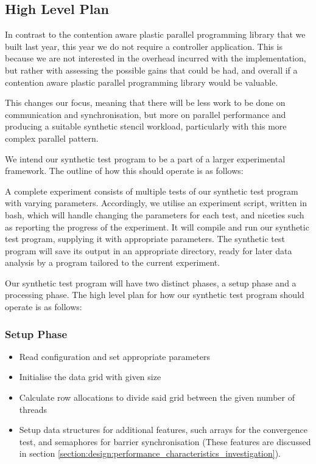 \subsection{High Level Plan}
\label{section:implementation:high_level_plan}

In contrast to the contention aware plastic parallel programming library that we built last year, this year we do not require a controller application. This is because we are not interested in the overhead incurred with the implementation, but rather with assessing the possible gains that could be had, and overall if a contention aware plastic parallel programming library would be valuable.

This changes our focus, meaning that there will be less work to be done on communication and synchronisation, but more on parallel performance and producing a suitable synthetic stencil workload, particularly with this more complex parallel pattern.

We intend our synthetic test program to be a part of a larger experimental framework. The outline of how this should operate is as follows: 

A complete experiment consists of multiple tests of our synthetic test program with varying parameters. Accordingly, we utilise an experiment script, written in bash, which will handle changing the parameters for each test, and niceties such as reporting the progress of the experiment. It will compile and run our synthetic test program, supplying it with appropriate parameters. The synthetic test program will save its output in an appropriate directory, ready for later data analysis by a program tailored to the current experiment. 

Our synthetic test program will have two distinct phases, a setup phase and a processing phase. The high level plan for how our synthetic test program should operate is as follows:



\subsubsection{Setup Phase}
\label{section:implementation:setup_phase}

\begin{itemize}
    \item Read configuration and set appropriate parameters
    \item Initialise the data grid with given size
    \item Calculate row allocations to divide said grid between the given number of threads
    \item Setup data structures for additional features, such arrays for the convergence test, and semaphores for barrier synchronisation (These features are discussed in section \ref{section:design:performance_characteristics_investigation}).
\end{itemize}



